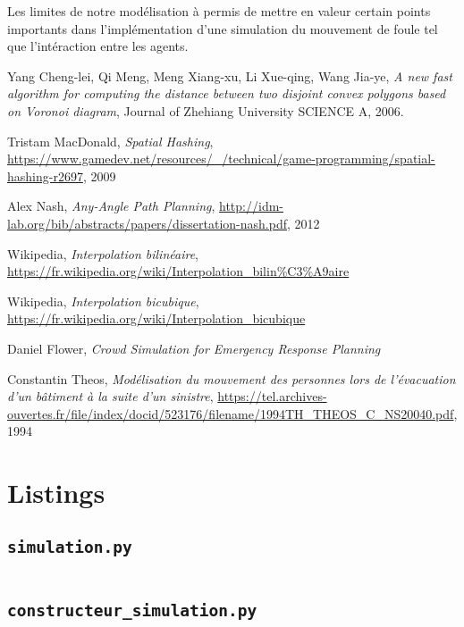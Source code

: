 \documentclass{article}
\newcommand{\referencetitle}[1]{\textit{#1}}
\newcommand{\filename}[1]{\texttt{#1}}
\begin{document}
Les limites de notre modélisation à permis de mettre en valeur certain
points importants dans l'implémentation d'une simulation du mouvement
de foule tel que l'intéraction entre les agents.

\appendix

\begin{thebibliography}{9}

  Yang Cheng-lei,
  Qi Meng,
  Meng Xiang-xu,
  Li Xue-qing,
  Wang Jia-ye,
  \referencetitle{A new fast algorithm for computing the distance  between two disjoint convex polygons based on Voronoi diagram},
  Journal of Zhehiang University SCIENCE A,
  2006.

  Tristam MacDonald,
  \referencetitle{Spatial Hashing},
  \url{https://www.gamedev.net/resources/_/technical/game-programming/spatial-hashing-r2697},
  2009

  Alex Nash,
  \referencetitle{Any-Angle Path Planning},
  \url{http://idm-lab.org/bib/abstracts/papers/dissertation-nash.pdf},
  2012

  Wikipedia,
  \referencetitle{Interpolation bilinéaire},
  \url{https://fr.wikipedia.org/wiki/Interpolation_bilin%C3%A9aire}

  Wikipedia,
  \referencetitle{Interpolation bicubique},
  \url{https://fr.wikipedia.org/wiki/Interpolation_bicubique}

  Daniel Flower,
  \referencetitle{Crowd Simulation for Emergency Response Planning}

  Constantin Theos,
  \referencetitle{Modélisation du mouvement des personnes lors de
    l'évacuation d'un bâtiment à la suite d'un sinistre},
  \url{https://tel.archives-ouvertes.fr/file/index/docid/523176/filename/1994TH_THEOS_C_NS20040.pdf},
  1994
  
\end{thebibliography}
  
\section{Listings}

\subsection{\filename{simulation.py}}
\inputminted{python}{lst/simulation.py}
\subsection{\filename{constructeur\_simulation.py}}
\inputminted{python}{lst/constructeur_simulation.py}
\end{document}

